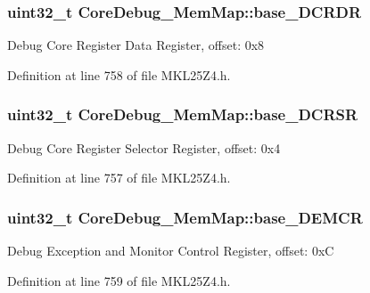 \subsubsection[{\texorpdfstring{base\+\_\+\+D\+C\+R\+DR}{base_DCRDR}}]{\setlength{\rightskip}{0pt plus 5cm}uint32\+\_\+t Core\+Debug\+\_\+\+Mem\+Map\+::base\+\_\+\+D\+C\+R\+DR}\hypertarget{struct_core_debug___mem_map_aac76a717b2aba2ccbf75e020cc71fb3e}{}\label{struct_core_debug___mem_map_aac76a717b2aba2ccbf75e020cc71fb3e}
Debug Core Register Data Register, offset\+: 0x8 

Definition at line 758 of file M\+K\+L25\+Z4.\+h.

\subsubsection[{\texorpdfstring{base\+\_\+\+D\+C\+R\+SR}{base_DCRSR}}]{\setlength{\rightskip}{0pt plus 5cm}uint32\+\_\+t Core\+Debug\+\_\+\+Mem\+Map\+::base\+\_\+\+D\+C\+R\+SR}\hypertarget{struct_core_debug___mem_map_ad9c98f7390e5d3a6b54df56ddea32e8b}{}\label{struct_core_debug___mem_map_ad9c98f7390e5d3a6b54df56ddea32e8b}
Debug Core Register Selector Register, offset\+: 0x4 

Definition at line 757 of file M\+K\+L25\+Z4.\+h.

\subsubsection[{\texorpdfstring{base\+\_\+\+D\+E\+M\+CR}{base_DEMCR}}]{\setlength{\rightskip}{0pt plus 5cm}uint32\+\_\+t Core\+Debug\+\_\+\+Mem\+Map\+::base\+\_\+\+D\+E\+M\+CR}\hypertarget{struct_core_debug___mem_map_a13a099e668fcb3587b2cd6eb8f8608d5}{}\label{struct_core_debug___mem_map_a13a099e668fcb3587b2cd6eb8f8608d5}
Debug Exception and Monitor Control Register, offset\+: 0xC 

Definition at line 759 of file M\+K\+L25\+Z4.\+h.

